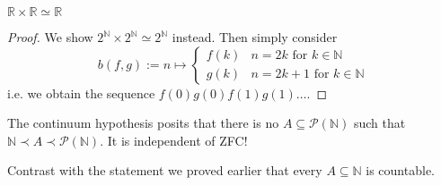 \documentclass{whrartcl}
\newcommand{\NN}{\mathbb{N}}
\newcommand{\RR}{\mathbb{R}}
\newcommand{\pow}{\mathcal{P}}
\begin{document}
\begin{lemma}
  $\RR \times \RR \simeq \RR$
\end{lemma}
\begin{proof}
  We show $2^\NN \times 2^\NN \simeq 2^\NN$ instead. Then simply consider
  \[
    b(f, g) := n \mapsto
    \begin{cases}
      f(k) & n = 2k \text{ for } k \in \NN \\
      g(k) & n = 2k + 1 \text{ for } k \in \NN
    \end{cases}
  \]
  i.e. we obtain the sequence $f(0)g(0)f(1)g(1)\ldots$.
\end{proof}

\begin{remark}
  The continuum hypothesis posits that there is no $A \subseteq \pow(\NN)$ such
  that $\NN \prec A \prec \pow(\NN)$. It is independent of ZFC!

  Contrast with the statement we proved earlier that every $A \subseteq \NN$ is countable.
\end{remark}

\printbibliography{}
\end{document}
